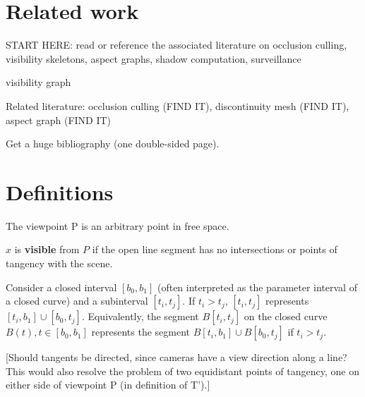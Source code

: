\documentclass[12pt]{article}
\begin{document}



\section{Related work}

START HERE: read or reference the associated literature on occlusion culling, visibility
            skeletons, aspect graphs, shadow computation, surveillance

visibility graph 

Related literature: occlusion culling (FIND IT), discontinuity mesh (FIND IT),
aspect graph (FIND IT)

Get a huge bibliography (one double-sided page).


\section{Definitions} 

The viewpoint P is an arbitrary point in free space.

\begin{defn2}
$x$ is {\bf visible} from $P$ if the open line segment  
has no intersections or points of tangency with the scene.
\end{defn2}

\begin{defn2}
Consider a closed interval $[b_0,b_1]$ (often interpreted as the parameter interval
of a closed curve) and a subinterval $[t_i,t_j]$.
If $t_i > t_j$, $[t_i,t_j]$ represents $[t_i,b_1] \cup [b_0,t_j]$.
Equivalently, the segment {\bf $B[t_i,t_j]$} 
on the closed curve $B(t), t \in [b_0,b_1]$ represents the segment
$B[t_i,b_1] \cup B[b_0,t_j]$ if $t_i > t_j$.
\end{defn2}

[Should tangents be directed, since cameras have a view direction along a line?
This would also resolve the problem of two equidistant points of tangency, one
on either side of viewpoint P (in definition of T').]
\end{document}
